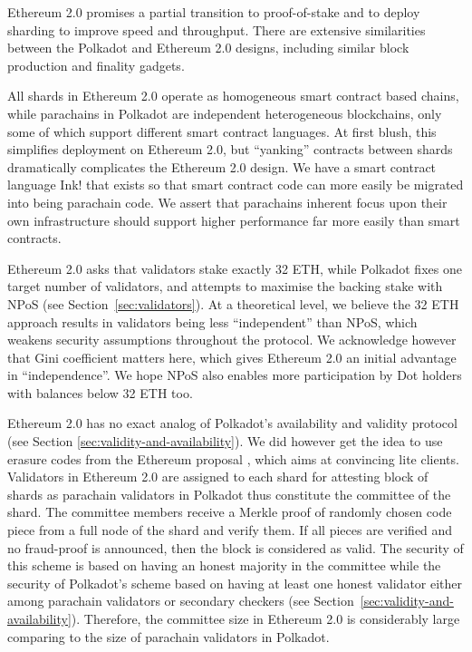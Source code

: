 Ethereum 2.0 promises a partial transition to proof-of-stake and to deploy sharding to improve speed and throughput.  There are extensive similarities between the Polkadot and Ethereum 2.0 designs, including similar block production and finality gadgets.  

All shards in Ethereum 2.0 operate as homogeneous smart contract based chains, while parachains in Polkadot are independent heterogeneous blockchains, only some of which support different smart contract languages.  
At first blush, this simplifies deployment on Ethereum 2.0, but ``yanking'' contracts between shards dramatically complicates the Ethereum 2.0 design.  We have a smart contract language Ink! that exists so that smart contract code can more easily be migrated into being parachain code.  We assert that parachains inherent focus upon their own infrastructure should support higher performance far more easily than smart contracts.

Ethereum 2.0 asks that validators stake exactly 32 ETH, while Polkadot fixes one target number of validators, and attempts to maximise the backing stake with NPoS (see Section~\ref{sec:validators}).  At a theoretical level, we believe the 32 ETH approach results in validators being less ``independent'' than NPoS, which weakens security assumptions throughout the protocol.  We acknowledge however that Gini coefficient matters here, which gives Ethereum 2.0 an initial advantage in ``independence''.  We hope NPoS also enables more participation by Dot holders with balances below 32 ETH too.

Ethereum 2.0 has no exact analog of Polkadot's availability and validity protocol (see Section \ref{sec:validity-and-availability}).  We did however get the idea to use erasure codes from the Ethereum proposal \cite{availabilityETH2}, which aims at convincing lite clients.  
Validators in Ethereum 2.0 are assigned to each shard for attesting block of shards as parachain validators in Polkadot thus constitute the committee of the shard. The committee members receive a Merkle proof of randomly chosen code piece from a full node of the shard and verify them. If all pieces are verified and no fraud-proof is announced, then the block is considered as valid. The security of this scheme is based on having an honest majority in the committee while the security of Polkadot's scheme based on having at least one honest validator either among parachain validators or secondary checkers (see Section~\ref{sec:validity-and-availability}). Therefore, the committee size in Ethereum 2.0 is considerably large comparing to the size of parachain validators in Polkadot. 

